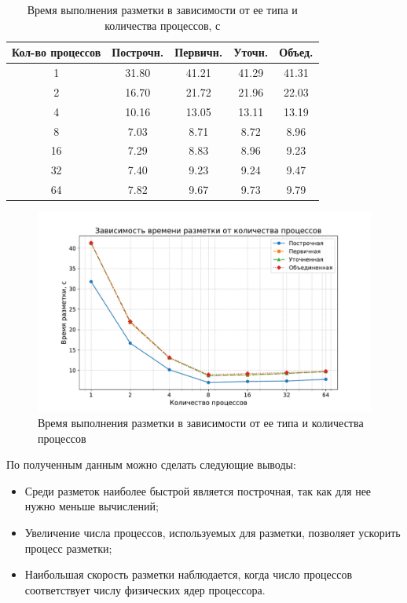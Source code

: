\begin{table}[H]
    \centering
    \caption{Время выполнения разметки в зависимости от ее типа и количества процессов, с}
    \label{tab:tama}
    \begin{tabular}{|c|c|c|c|c|}
        \hline
        \textbf{Кол-во процессов} & \textbf{Построчн.} & \textbf{Первичн.} & \textbf{Уточн.} & \textbf{Объед.} \\ \hline
        1 & 31.80 & 41.21 & 41.29 & 41.31 \\ \hline
        2 & 16.70 & 21.72 & 21.96 & 22.03 \\ \hline
        4 & 10.16 & 13.05 & 13.11 & 13.19 \\ \hline
        8 & 7.03 & 8.71 & 8.72 & 8.96 \\ \hline
        16 & 7.29 & 8.83 & 8.96 & 9.23 \\ \hline
        32 & 7.40 & 9.23 & 9.24 & 9.47 \\ \hline
        64 & 7.82 & 9.67 & 9.73 & 9.79 \\ \hline
    \end{tabular}
\end{table}

\begin{figure}[H]
	\centering
	\includegraphics[width=\textwidth]{diag/tama.pdf}
    \caption{Время выполнения разметки в зависимости от ее типа и количества процессов}
	\label{fig:tama}
\end{figure}

\newpage

По полученным данным можно сделать следующие выводы:
\begin{itemize}
    \item Среди разметок наиболее быстрой является построчная, так как для нее нужно меньше вычислений;
    \item Увеличение числа процессов, используемых для разметки, позволяет ускорить процесс разметки;
    \item Наибольшая скорость разметки наблюдается, когда число процессов соответствует числу физических ядер процессора.
\end{itemize}

